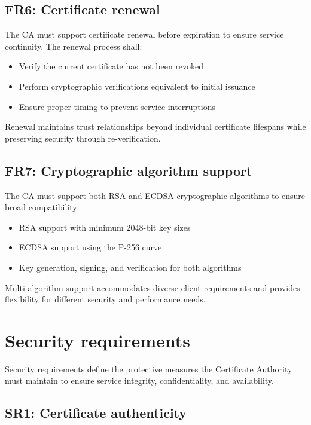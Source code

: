 \subsection{FR6: Certificate renewal}

The CA must support certificate renewal before expiration to ensure service 
continuity. The renewal process shall:

\begin{itemize}
    \item Verify the current certificate has not been revoked
    \item Perform cryptographic verifications equivalent to initial issuance
    \item Ensure proper timing to prevent service interruptions
\end{itemize}
Renewal maintains trust relationships beyond individual certificate lifespans 
while preserving security through re-verification.

\subsection{FR7: Cryptographic algorithm support}

The CA must support both RSA and ECDSA cryptographic algorithms to ensure 
broad compatibility:

\begin{itemize}
    \item RSA support with minimum 2048-bit key sizes
    \item ECDSA support using the P-256 curve
    \item Key generation, signing, and verification for both algorithms
\end{itemize}
Multi-algorithm support accommodates diverse client requirements and provides 
flexibility for different security and performance needs.

\section{Security requirements}

Security requirements define the protective measures the Certificate Authority 
must maintain to ensure service integrity, confidentiality, and 
availability.

\subsection{SR1: Certificate authenticity}

